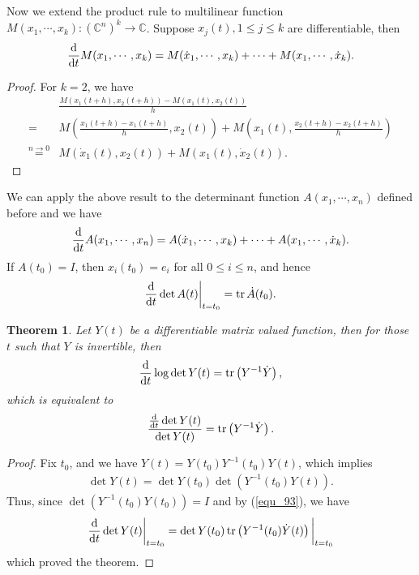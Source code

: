 \documentclass[11pt]{book}
\newtheorem{theorem}{Theorem}[chapter]
\theoremstyle{definition}
\numberwithin{equation}{chapter}
\begin{document}
Now we extend the product rule to multilinear function $M(x_1,\cdots, x_k): \left(\mathbb{C}^n\right)^k \to \mathbb{C}$. Suppose $x_j(t), 1\leq j \leq k$ are differentiable, then 
\begin{align}
    \dv{}{t}M(x_1,\cdots, x_k) = M(\dot{x}_1,\cdots, x_k) + \cdots + M(x_1,\cdots, \dot{x}_k).
\end{align}
\begin{proof}
For $k=2$, we have
\begin{align*}
    & \frac{M(x_1(t+h), x_2(t+h)) - M(x_1(t), x_2(t))}{h} \\
    = & M\left(\frac{x_1(t+h)-x_1(t+h)}{h}, x_2(t)\right) + M\left(x_1(t),\frac{x_2(t+h)-x_2(t+h)}{h} \right) \\
    \overset{n\to 0}{=} & M(\dot{x}_1(t), x_2(t)) + M(x_1(t), \dot{x}_2(t)).
\end{align*}
\end{proof}

We can apply the above result to the determinant function $A(x_1,\cdots,x_n)$ defined before and we have
\begin{align}
    \dv{}{t}A(x_1,\cdots,x_n) = A(\dot{x}_1,\cdots, x_k) + \cdots + A(x_1,\cdots, \dot{x}_k).
\end{align}
If $A(t_0) = I$, then $x_i(t_0) = e_i$ for all $0 \leq i \leq n$, and hence
\begin{align}\label{equ_93}
    \dv{}{t} \det A(t)\bigg|_{t=t_0} = \tr \dot{A}(t_0).
\end{align}

\medskip

\begin{theorem}\label{trace_determinant}
Let $Y(t)$ be a differentiable matrix valued function, then for those $t$ such that $Y$ is invertible, then
\begin{align*}
    \dv{}{t} \log \det Y(t) = \tr \left(Y^{-1} \dot{Y}\right),
\end{align*}
which is equivalent to 
\begin{align*}
    \frac{\dv{}{t}\det Y(t)}{\det Y(t)} = \tr \left(Y^{-1} \dot{Y}\right).
\end{align*}
\end{theorem}
\begin{proof}
Fix $t_0$, and we have $Y(t) = Y(t_0) Y^{-1}(t_0) Y(t)$, which implies
\begin{align*}
    \det Y(t) = \det Y(t_0) \det (Y^{-1}(t_0) Y(t)).
\end{align*}
Thus, since $\det (Y^{-1}(t_0) Y(t_0)) = I$ and by (\ref{equ_93}), we have
\begin{align*}
    \dv{}{t}\det Y(t)\bigg|_{t=t_0} = \det Y(t_0) \tr \left(Y^{-1}(t_0) \dot{Y}(t) \right)\bigg|_{t=t_0}
\end{align*}
which proved the theorem.
\end{proof}
\end{document}
